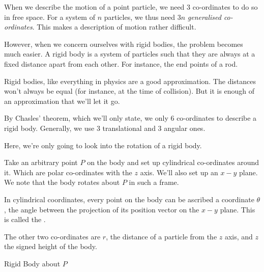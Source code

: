 When we describe the motion of a point particle, we need \(3\) co-ordinates 
to do so in free space. For a system of \(n\) particles, we thus need
\(3n\) \emph{generalised co-ordinates}. This makes a description of motion
rather difficult. 

However, when we concern ourselves with rigid bodies, the problem becomes
much easier. A rigid body is a system of particles such that they are 
always at a fixed distance apart from each other. For instance, 
the end points of a rod.

Rigid bodies, like everything in physics are a good approximation. 
The distances won't always be equal (for instance, at the time of collision).
But it is enough of an approximation that we'll let it go.

By Chasles' theorem, which we'll only state, we only \(6\) co-ordinates to 
describe a rigid body. Generally, we use \(3\) translational and \(3\) angular
ones.

Here, we're only going to look into the rotation of a rigid body.

Take an arbitrary point \(P\) on the body and set up cylindrical co-ordinates around it.
Which are polar co-ordinates with the \(z\) axis. We'll also set up an \(x-y\)
plane.
We note that the body rotates about \(P\) in such a frame.


In cylindrical coordinates, every point on the body can be ascribed a
coordinate \(\theta\), the angle between the projection of its position vector on the 
\(x-y\) plane. This is called the .

The other two co-ordinates are \(r\), the distance of a particle from the 
\(z\) axis, and \(z\) the signed height of the body.

\begin{marginfigure}
    \centering
    \caption{Rigid Body about \(P\)}
\end{marginfigure}

